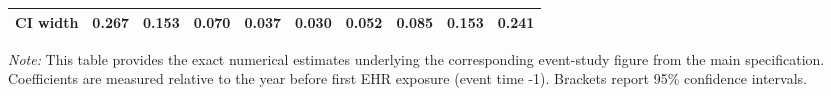 \begin{landscape}
\begin{table}[!h]
\begin{tabular}[t]{lccccccccc}
\hspace{1em}CI width & 0.267 & 0.153 & 0.070 & 0.037 & 0.030 & 0.052 & 0.085 & 0.153 & 0.241\\
\bottomrule
\end{tabular}
\begin{tablenotes}
\item \textit{Note: } This table provides the exact numerical estimates underlying the corresponding event-study figure from the main specification. Coefficients are measured relative to the year before first EHR exposure (event time -1). Brackets report 95\% confidence intervals. 
\end{tablenotes}
\end{table}
\end{landscape}
